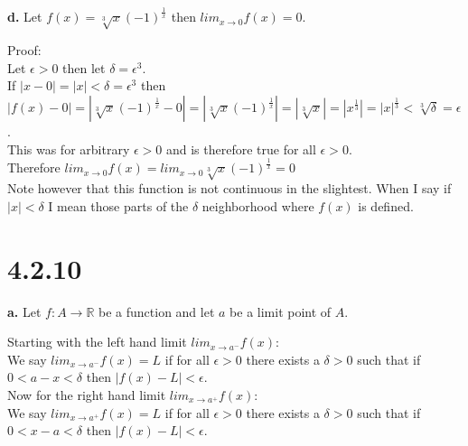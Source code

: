 \documentclass{article}
\begin{document}
\newpage
{\Large \textbf{d.}} Let $f(x) =\sqrt[3]{x} (-1)^{\frac{1}{x}}$ then $lim _{x\rightarrow 0} f(x) = 0$.
\begin{center}
    \doublespacing
    Proof:
    \\Let $\epsilon > 0$ then let $\delta =\epsilon ^3$.
    \\If $|x - 0| = |x| <\delta =\epsilon ^3$ then $|f(x) - 0| = |\sqrt[3]{x} (-1)^{\frac{1}{x}} - 0| = |\sqrt[3]{x} (-1)^{\frac{1}{x}}| = |\sqrt[3]{x}| = |x^\frac{1}{3}| = |x|^\frac{1}{3} <\sqrt[3]{\delta} =\epsilon$.
    \\This was for arbitrary $\epsilon > 0$ and is therefore true for all $\epsilon > 0$.
    \\Therefore $lim _{x\rightarrow 0} f(x) = lim _{x\rightarrow 0} \sqrt[3]{x} (-1)^{\frac{1}{x}} = 0$ \qedsymbol
    \\Note however that this function is not continuous in the slightest. When I say if $|x| <\delta$ I mean those parts of the $\delta$ neighborhood where $f(x)$ is defined.
\end{center}


\newpage
\section*{4.2.10}

{\Large \textbf{a.}} Let $f: A\rightarrow\mathbb{R}$ be a function and let $a$ be a limit point of $A$.
\begin{center}
    \doublespacing
    Starting with the left hand limit $lim _{x\rightarrow a^{-}} f(x)$:
    \\We say $lim _{x\rightarrow a^{-}} f(x) = L$ if for all $\epsilon > 0$ there exists a $\delta > 0$ such that if $0 < a - x <\delta$ then $|f(x) - L| <\epsilon$.
    \\Now for the right hand limit $lim _{x\rightarrow a^{+}} f(x)$:
    \\We say $lim _{x\rightarrow a^{+}} f(x) = L$ if for all $\epsilon > 0$ there exists a $\delta > 0$ such that if $0 < x - a <\delta$ then $|f(x) - L| <\epsilon$.
\end{center}
\end{document}
